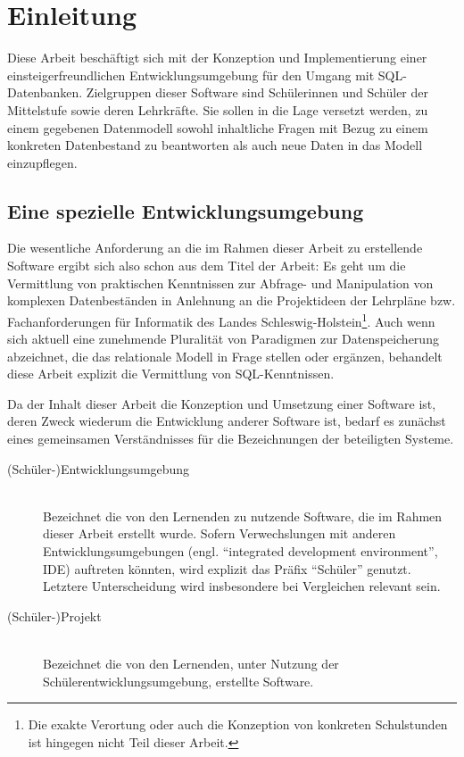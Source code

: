 \documentclass[paper=a4,fontsize=11pt,parskip=half]{scrartcl}
\title{\doctitle}
\subtitle{\docsubtitle}
\author{\docauthors}
\date{\today{}}
\begin{document}

\newpage{}

\tableofcontents{}
\newpage{}



\section{Einleitung}

Diese Arbeit beschäftigt sich mit der Konzeption und Implementierung einer einsteigerfreundlichen Entwicklungsumgebung für den Umgang mit SQL-Datenbanken. Zielgruppen dieser Software sind Schülerinnen und Schüler der Mittelstufe sowie deren Lehrkräfte. Sie sollen in die Lage versetzt werden, zu einem gegebenen Datenmodell sowohl inhaltliche Fragen mit Bezug zu einem konkreten Datenbestand zu beantworten als auch neue Daten in das Modell einzupflegen.

\subsection{Eine spezielle Entwicklungsumgebung}

Die wesentliche Anforderung an die im Rahmen dieser Arbeit zu erstellende Software ergibt sich also schon aus dem Titel der Arbeit: Es geht um die Vermittlung von praktischen Kenntnissen zur Abfrage- und Manipulation von komplexen Datenbeständen in Anlehnung an die Projektideen der Lehrpläne bzw. Fachanforderungen für Informatik des Landes Schleswig-Holstein\footnote{Die exakte Verortung oder auch die Konzeption von konkreten Schulstunden ist hingegen nicht Teil dieser Arbeit.}. Auch wenn sich aktuell eine zunehmende Pluralität von Paradigmen zur Datenspeicherung abzeichnet, die das relationale Modell in Frage stellen oder ergänzen, behandelt diese Arbeit explizit die Vermittlung von SQL-Kenntnissen.

Da der Inhalt dieser Arbeit die Konzeption und Umsetzung einer Software ist, deren Zweck wiederum die Entwicklung anderer Software ist, bedarf es zunächst eines gemeinsamen Verständnisses für die Bezeichnungen der beteiligten Systeme.

\begin{description}
\item[(Schüler-)Entwicklungsumgebung] \hfill\\ 
  Bezeichnet die von den Lernenden zu nutzende Software, die im Rahmen dieser Arbeit erstellt wurde. Sofern Verwechslungen mit anderen Entwicklungsumgebungen (engl. ``integrated development environment'', IDE) auftreten könnten, wird explizit das Präfix ``Schüler'' genutzt. Letztere Unterscheidung wird insbesondere bei Vergleichen relevant sein.
\item[(Schüler-)Projekt] \hfill\\
  Bezeichnet die von den Lernenden, unter Nutzung der Schülerentwicklungsumgebung, erstellte Software.
\end{description}
\end{document}
